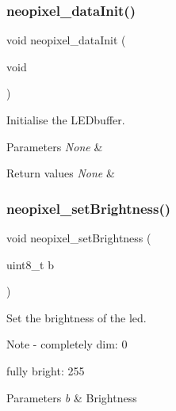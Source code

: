 \subsubsection{\texorpdfstring{neopixel\+\_\+data\+Init()}{neopixel\_dataInit()}}
{\footnotesize\ttfamily void neopixel\+\_\+data\+Init (\begin{DoxyParamCaption}\item[{void}]{ }\end{DoxyParamCaption})}



Initialise the L\+E\+Dbuffer. 


\begin{DoxyParams}{Parameters}
{\em None} & \\
\hline
\end{DoxyParams}

\begin{DoxyRetVals}{Return values}
{\em None} & \\
\hline
\end{DoxyRetVals}
\mbox{\label{group___state_gae027558106eef5c81996294f4561fecb}} 
\subsubsection{\texorpdfstring{neopixel\+\_\+set\+Brightness()}{neopixel\_setBrightness()}}
{\footnotesize\ttfamily void neopixel\+\_\+set\+Brightness (\begin{DoxyParamCaption}\item[{uint8\+\_\+t}]{b }\end{DoxyParamCaption})}



Set the brightness of the led. 

\begin{DoxyNote}{Note}
-\/ completely dim\+: 0
\begin{DoxyItemize}
\item fully bright\+: 255 
\end{DoxyItemize}
\end{DoxyNote}

\begin{DoxyParams}{Parameters}
{\em b} & Brightness \\
\hline
\end{DoxyParams}

